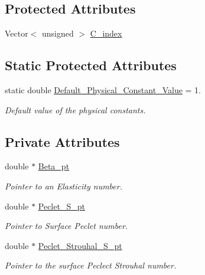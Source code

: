 \subsection*{Protected Attributes}
\begin{DoxyCompactItemize}
\item 
Vector$<$ unsigned $>$ \hyperlink{classoomph_1_1SurfactantTransportInterfaceElement_a26727fb7b57f88d3e1bdf4f2dd9f3b02}{C\+\_\+index}
\end{DoxyCompactItemize}
\subsection*{Static Protected Attributes}
\begin{DoxyCompactItemize}
\item 
static double \hyperlink{classoomph_1_1SurfactantTransportInterfaceElement_ae2c6f40fd7bc427636ac25c23d816e74}{Default\+\_\+\+Physical\+\_\+\+Constant\+\_\+\+Value} = 1.
\begin{DoxyCompactList}\small\item\em Default value of the physical constants. \end{DoxyCompactList}\end{DoxyCompactItemize}
\subsection*{Private Attributes}
\begin{DoxyCompactItemize}
\item 
double $\ast$ \hyperlink{classoomph_1_1SurfactantTransportInterfaceElement_ab5140eb5a576820321032b10a894b530}{Beta\+\_\+pt}
\begin{DoxyCompactList}\small\item\em Pointer to an Elasticity number. \end{DoxyCompactList}\item 
double $\ast$ \hyperlink{classoomph_1_1SurfactantTransportInterfaceElement_a50b4771707337535c081324f2f0d8c30}{Peclet\+\_\+\+S\+\_\+pt}
\begin{DoxyCompactList}\small\item\em Pointer to Surface Peclet number. \end{DoxyCompactList}\item 
double $\ast$ \hyperlink{classoomph_1_1SurfactantTransportInterfaceElement_a3c4a6abcb3795ee53baff49864cd0020}{Peclet\+\_\+\+Strouhal\+\_\+\+S\+\_\+pt}
\begin{DoxyCompactList}\small\item\em Pointer to the surface Peclect Strouhal number. \end{DoxyCompactList}\end{DoxyCompactItemize}


